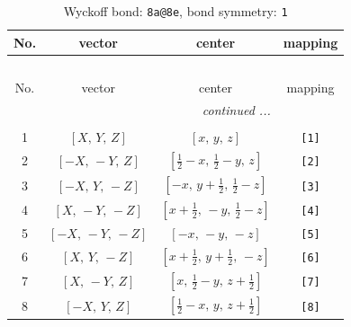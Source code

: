 \documentclass[fleqn,8pt]{jsarticle}
\begin{document}
\begin{longtable}{cccc}
\caption{Wyckoff bond: {\tt 8a@8e}, bond symmetry: {\tt 1}}
 \\
 \hline \hline
No. & vector & center & mapping \\ \hline \endfirsthead

\multicolumn{3}{l}{\tablename\ \thetable{}} \\
 \hline \hline
No. & vector & center & mapping \\ \hline \endhead

 \hline \hline
\multicolumn{3}{r}{\footnotesize\it continued ...} \\ \endfoot

 \hline \hline
\multicolumn{3}{r}{} \\ \endlastfoot

1 & $\left[ X,\, Y,\, Z \right]$ & $\left[ x,\, y,\, z \right]$ & {\tt [1]} \\ \hline
2 & $\left[ - X,\, - Y,\, Z \right]$ & $\left[ \frac{1}{2} - x,\, \frac{1}{2} - y,\, z \right]$ & {\tt [2]} \\ \hline
3 & $\left[ - X,\, Y,\, - Z \right]$ & $\left[ - x,\, y + \frac{1}{2},\, \frac{1}{2} - z \right]$ & {\tt [3]} \\ \hline
4 & $\left[ X,\, - Y,\, - Z \right]$ & $\left[ x + \frac{1}{2},\, - y,\, \frac{1}{2} - z \right]$ & {\tt [4]} \\ \hline
5 & $\left[ - X,\, - Y,\, - Z \right]$ & $\left[ - x,\, - y,\, - z \right]$ & {\tt [5]} \\ \hline
6 & $\left[ X,\, Y,\, - Z \right]$ & $\left[ x + \frac{1}{2},\, y + \frac{1}{2},\, - z \right]$ & {\tt [6]} \\ \hline
7 & $\left[ X,\, - Y,\, Z \right]$ & $\left[ x,\, \frac{1}{2} - y,\, z + \frac{1}{2} \right]$ & {\tt [7]} \\ \hline
8 & $\left[ - X,\, Y,\, Z \right]$ & $\left[ \frac{1}{2} - x,\, y,\, z + \frac{1}{2} \right]$ & {\tt [8]} \\
\end{longtable}
\end{document}
